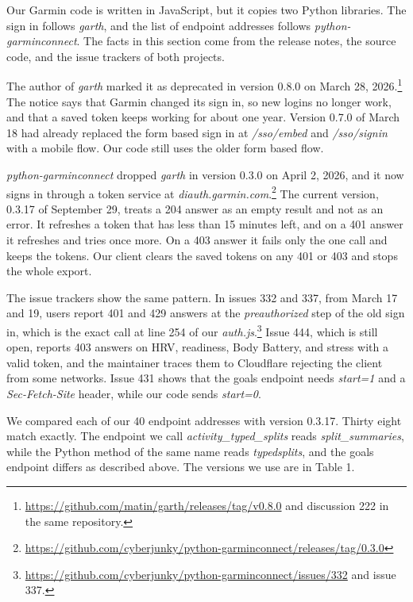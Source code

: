 \documentclass[11pt]{article}
\newcommand\code[1]{\textit{#1}}
\begin{document}
 Our Garmin code is written in JavaScript, but it copies two Python libraries. The sign in follows \code{garth}, and the list of endpoint addresses follows \code{python-garminconnect}. The facts in this section come from the release notes, the source code, and the issue trackers of both projects.

The author of \code{garth} marked it as deprecated in version 0.8.0 on March 28, 2026.\footnote{\url{https://github.com/matin/garth/releases/tag/v0.8.0} and discussion 222 in the same repository.} The notice says that Garmin changed its sign in, so new logins no longer work, and that a saved token keeps working for about one year. Version 0.7.0 of March 18 had already replaced the form based sign in at \code{/sso/embed} and \code{/sso/signin} with a mobile flow. Our code still uses the older form based flow.

\code{python-garminconnect} dropped \code{garth} in version 0.3.0 on April 2, 2026, and it now signs in through a token service at \code{diauth.garmin.com}.\footnote{\url{https://github.com/cyberjunky/python-garminconnect/releases/tag/0.3.0}} The current version, 0.3.17 of September 29, treats a 204 answer as an empty result and not as an error. It refreshes a token that has less than 15 minutes left, and on a 401 answer it refreshes and tries once more. On a 403 answer it fails only the one call and keeps the tokens. Our client clears the saved tokens on any 401 or 403 and stops the whole export.

The issue trackers show the same pattern. In issues 332 and 337, from March 17 and 19, users report 401 and 429 answers at the \code{preauthorized} step of the old sign in, which is the exact call at line 254 of our \code{auth.js}.\footnote{\url{https://github.com/cyberjunky/python-garminconnect/issues/332} and issue 337.} Issue 444, which is still open, reports 403 answers on HRV, readiness, Body Battery, and stress with a valid token, and the maintainer traces them to Cloudflare rejecting the client from some networks. Issue 431 shows that the goals endpoint needs \code{start=1} and a \code{Sec-Fetch-Site} header, while our code sends \code{start=0}.

We compared each of our 40 endpoint addresses with version 0.3.17. Thirty eight match exactly. The endpoint we call \code{activity\_typed\_splits} reads \code{split\_summaries}, while the Python method of the same name reads \code{typedsplits}, and the goals endpoint differs as described above. The versions we use are in Table 1.
\end{document}
